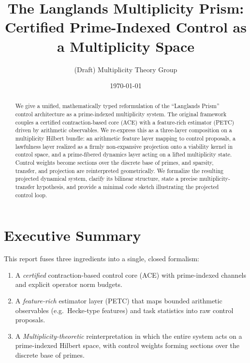 \documentclass[11pt]{article}
\title{The Langlands Multiplicity Prism:\\
Certified Prime-Indexed Control as a Multiplicity Space}
\author[1]{(Draft) Multiplicity Theory Group}
\affil[1]{Bridgeville, PA}
\date{\today}
\begin{document}
\maketitle

\begin{abstract}
We give a unified, mathematically typed reformulation of the ``Langlands Prism'' control architecture as a prime-indexed multiplicity system. The original framework couples a certified contraction-based core (ACE) with a feature-rich estimator (PETC) driven by arithmetic observables. We re-express this as a three-layer composition on a multiplicity Hilbert bundle: an arithmetic feature layer mapping to control proposals, a lawfulness layer realized as a firmly non-expansive projection onto a viability kernel in control space, and a prime-fibered dynamics layer acting on a lifted multiplicity state. Control weights become sections over the discrete base of primes, and sparsity, transfer, and projection are reinterpreted geometrically. We formalize the resulting projected dynamical system, clarify its bilinear structure, state a precise multiplicity-transfer hypothesis, and provide a minimal code sketch illustrating the projected control loop.
\end{abstract}

\tableofcontents

\section{Executive Summary}

This report fuses three ingredients into a single, closed formalism:
\begin{enumerate}[label=(\roman*)]
  \item A \emph{certified} contraction-based control core (ACE) with prime-indexed channels and explicit operator norm budgets.
  \item A \emph{feature-rich} estimator layer (PETC) that maps bounded arithmetic observables (e.g.\ Hecke-type features) and task statistics into raw control proposals.
  \item A \emph{Multiplicity-theoretic} reinterpretation in which the entire system acts on a prime-indexed Hilbert space, with control weights forming sections over the discrete base of primes.
\end{enumerate}
\end{document}
